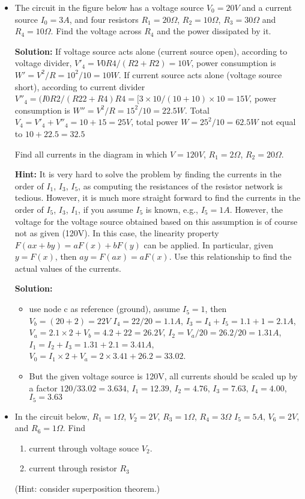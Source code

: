 \begin{enumerate}
\begin{enumerate}
\begin{itemize}
\begin{itemize}
\item The circuit in the figure below has a voltage source $V_0=20V$ and a 
current source $I_0=3A$, and four resistors $R_1=20\Omega$, $R_2=10\Omega$, 
$R_3=30\Omega$ and $R_4=10\Omega$. Find the voltage across $R_4$ and the 
power dissipated by it.


{\bf Solution:}
If voltage source acts alone (current source open), according to voltage 
divider, $V'_4=V0 R4/(R2+R2)=10V$, power consumption is $W'=V^2/R=10^2/10=10W$.
If current source acts alone (voltage source short), according to current 
divider $V''_4=(I0 R2/(R22+R4) R4=[3\times 10/(10+10)\times 10=15V$, power 
consumption is $W''=V^2/R=15^2/10=22.5W$. Total $V_4=V'_4+V''_4=10+15=25V$, 
total power $W=25^2/10=62.5W$ not equal to $10+22.5=32.5$

Find all currents in the diagram in which $V=120V$, $R_1=2\Omega$, 
$R_2=20\Omega$. 

{\bf Hint:} It is very hard to solve the problem by finding the currents in 
the order of $I_1$, $I_3$, $I_5$, as computing the resistances of the resistor 
network is tedious. However, it is much more straight forward to find the 
currents in the order of $I_5$, $I_3$, $I_1$, if you assume $I_5$ is known, 
e.g., $I_5=1A$. However, the voltage for the voltage source obtained based 
on this assumption is of course not as given (120V). In this case, the 
linearity property $F(ax+by)=aF(x)+bF(y)$ can be applied. In particular, 
given $y=F(x)$, then $ay=F(ax)=aF(x)$. Use this relationship to find the
actual values of the currents.


{\bf Solution:}
\begin{itemize}
\item use node c as reference (ground), assume $I_5=1$, then $V_b=(20+2)=22V$
$I_4=22/20=1.1A$, $I_3=I_4+I_5=1.1+1=2.1A$, $V_a=2.1\times 2+V_b=4.2+22=26.2V$,
$I_2=V_a/20=26.2/20=1.31A$, $I_1=I_2+I_3=1.31+2.1=3.41A$, 
$V_0=I_1\times 2+V_a=2\times 3.41+26.2=33.02$.
\item But the given voltage source is 120V, all currents should be scaled 
up by a factor $120/33.02=3.634$, $I_1=12.39$, $I_2=4.76$, $I_3=7.63$,
$I_4=4.00$, $I_5=3.63$
\end{itemize}

\item In the circuit below, $R_1=1\Omega$, $V_2=2V$, $R_3=1\Omega$, $R_4=3\Omega$
$I_5=5A$, $V_6=2V$, and $R_6=1\Omega$. Find
\begin{enumerate}
\item current through voltage souce $V_2$. 
\item current through resistor $R_3$
\end{enumerate}
(Hint: consider superposition theorem.)


\end{itemize}
\end{itemize}
\end{enumerate}
\end{enumerate}
